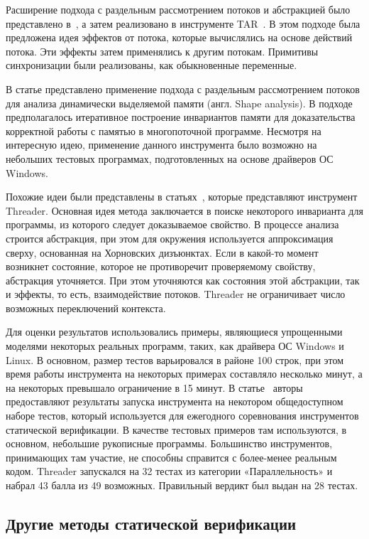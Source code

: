 Расширение подхода с раздельным рассмотрением потоков и абстракцией было представлено в~\cite{Malkis:2006}, а затем реализовано в инструменте TAR~\cite{TAR}.
В этом подходе была предложена идея эффектов от потока, которые вычислялись на основе действий потока.
Эти эффекты затем применялись к другим потокам.
Примитивы синхронизации были реализованы, как обыкновенные переменные.

В статье\cite{ShapeTM} представлено применение подхода с раздельным рассмотрением потоков для анализа динамически выделяемой памяти (англ. Shape analysis). 
В подходе предполагалось итеративное построение инвариантов памяти для доказательства корректной работы с памятью в многопоточной программе.
Несмотря на интересную идею, применение данного инструмента было возможно на небольших тестовых программах, подготовленных на основе драйверов ОС Windows.

Похожие идеи были представлены в статьях~\cite{Threader:2011,Gupta:2011:POPL,Gupta:2011}, которые представляют инструмент Threader.
Основная идея метода заключается в поиске некоторого инварианта для программы, из которого следует доказываемое свойство.
В процессе анализа строится абстракция, при этом для окружения используется аппроксимация сверху, основанная на Хорновских дизъюнктах.
Если в какой-то момент возникнет состояние, которое не противоречит проверяемому свойству, абстракция уточняется.
При этом уточняются как состояния этой абстракции, так и эффекты, то есть, взаимодействие потоков.
Threader не ограничивает число возможных переключений контекста.

Для оценки результатов использовались примеры, являющиеся упрощенными моделями некоторых реальных программ, таких, как драйвера ОС Windows и Linux.
В основном, размер тестов варьировался в районе 100 строк, при этом время работы инструмента на некоторых примерах составляло несколько минут, а на некоторых превышало ограничение в 15 минут. 
В статье~\cite{Threader:svcomp} авторы предоставляют результаты запуска инструмента на некотором общедоступном наборе тестов, который используется для ежегодного соревнования инструментов статической верификации. 
В качестве тестовых примеров там используются, в основном, небольшие рукописные программы.
Большинство инструментов, принимающих там участие, не способны справится с более-менее реальным кодом.
Threader запускался на 32 тестах из категории «Параллельность» и набрал 43 балла из 49 возможных. Правильный вердикт был выдан на 28 тестах.


\subsection{Другие методы статической верификации}

